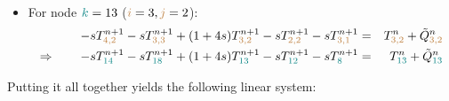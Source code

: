 \begin{itemize}
\item For node ${\color{teal}k}=13$ (${\color{brown}i}=3,{\color{brown}j}=2$):
\begin{eqnarray}
-s T_{{\color{brown} 4,2}}^{n+1}
-s T_{{\color{brown}3,3}}^{n+1} 
+(1+4s)T_{{\color{brown}3,2}}^{n+1} 
-s T_{{\color{brown}2,2}}^{n+1} 
-s T_{{\color{brown}3,1}}^{n+1} 
&=& T_{{\color{brown}3,2}}^n 
+\tilde{Q}_{{\color{brown}3,2}}^n \nonumber\\
\Rightarrow \qquad
-s T_{{\color{teal} 14}}^{n+1}
-s T_{{\color{teal} 18}}^{n+1} 
+(1+4s)T_{{\color{teal}13}}^{n+1} 
-s T_{{\color{teal}12}}^{n+1} 
-s T_{{\color{teal}8}}^{n+1} 
&=& T_{{\color{teal}13}}^n 
+\tilde{Q}_{{\color{teal}13}}^n \nonumber
\end{eqnarray}


\end{itemize}

Putting it all together yields the following linear system:

